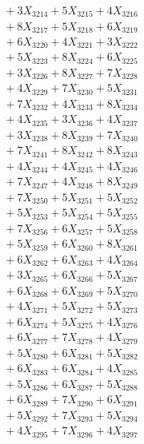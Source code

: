 \documentclass[a4paper,10pt]{article}
\begin{document}
{\begin{align}
&\;  + 3 X_{3214} + 5 X_{3215} + 4 X_{3216} \\[0.3ex]
&\;  + 8 X_{3217} + 5 X_{3218} + 6 X_{3219} \\[0.5ex]\allowbreak
&\;  + 6 X_{3220} + 4 X_{3221} + 3 X_{3222} \\[0.3ex]
&\;  + 5 X_{3223} + 8 X_{3224} + 6 X_{3225} \\[0.3ex]
&\;  + 3 X_{3226} + 8 X_{3227} + 7 X_{3228} \\[0.3ex]
&\;  + 4 X_{3229} + 7 X_{3230} + 5 X_{3231} \\[0.3ex]
&\;  + 7 X_{3232} + 4 X_{3233} + 8 X_{3234} \\[0.3ex]
&\;  + 4 X_{3235} + 3 X_{3236} + 4 X_{3237} \\[0.3ex]
&\;  + 3 X_{3238} + 8 X_{3239} + 7 X_{3240} \\[0.3ex]
&\;  + 7 X_{3241} + 8 X_{3242} + 8 X_{3243} \\[0.3ex]
&\;  + 4 X_{3244} + 4 X_{3245} + 4 X_{3246} \\[0.3ex]
&\;  + 7 X_{3247} + 4 X_{3248} + 8 X_{3249} \\[0.5ex]\allowbreak
&\;  + 7 X_{3250} + 5 X_{3251} + 5 X_{3252} \\[0.3ex]
&\;  + 5 X_{3253} + 5 X_{3254} + 5 X_{3255} \\[0.3ex]
&\;  + 7 X_{3256} + 6 X_{3257} + 5 X_{3258} \\[0.3ex]
&\;  + 5 X_{3259} + 6 X_{3260} + 8 X_{3261} \\[0.3ex]
&\;  + 6 X_{3262} + 6 X_{3263} + 4 X_{3264} \\[0.3ex]
&\;  + 3 X_{3265} + 6 X_{3266} + 5 X_{3267} \\[0.3ex]
&\;  + 6 X_{3268} + 6 X_{3269} + 5 X_{3270} \\[0.3ex]
&\;  + 4 X_{3271} + 5 X_{3272} + 5 X_{3273} \\[0.3ex]
&\;  + 6 X_{3274} + 5 X_{3275} + 4 X_{3276} \\[0.3ex]
&\;  + 6 X_{3277} + 7 X_{3278} + 4 X_{3279} \\[0.5ex]\allowbreak
&\;  + 5 X_{3280} + 6 X_{3281} + 5 X_{3282} \\[0.3ex]
&\;  + 6 X_{3283} + 6 X_{3284} + 4 X_{3285} \\[0.3ex]
&\;  + 5 X_{3286} + 6 X_{3287} + 5 X_{3288} \\[0.3ex]
&\;  + 6 X_{3289} + 7 X_{3290} + 6 X_{3291} \\[0.3ex]
&\;  + 5 X_{3292} + 7 X_{3293} + 5 X_{3294} \\[0.3ex]
&\;  + 4 X_{3295} + 7 X_{3296} + 4 X_{3297} \\[0.3ex]

\end{align}}
\end{document}
